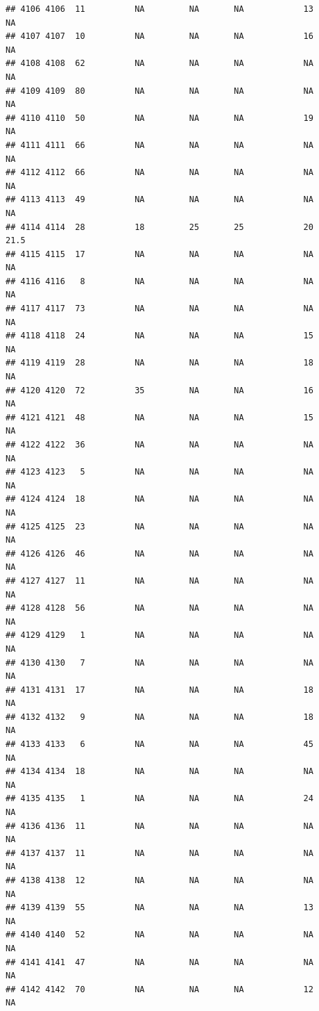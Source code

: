 \documentclass[man]{apa6}
\begin{document}
\begin{verbatim}
## 4106 4106  11          NA         NA       NA            13       NA
## 4107 4107  10          NA         NA       NA            16       NA
## 4108 4108  62          NA         NA       NA            NA       NA
## 4109 4109  80          NA         NA       NA            NA       NA
## 4110 4110  50          NA         NA       NA            19       NA
## 4111 4111  66          NA         NA       NA            NA       NA
## 4112 4112  66          NA         NA       NA            NA       NA
## 4113 4113  49          NA         NA       NA            NA       NA
## 4114 4114  28          18         25       25            20     21.5
## 4115 4115  17          NA         NA       NA            NA       NA
## 4116 4116   8          NA         NA       NA            NA       NA
## 4117 4117  73          NA         NA       NA            NA       NA
## 4118 4118  24          NA         NA       NA            15       NA
## 4119 4119  28          NA         NA       NA            18       NA
## 4120 4120  72          35         NA       NA            16       NA
## 4121 4121  48          NA         NA       NA            15       NA
## 4122 4122  36          NA         NA       NA            NA       NA
## 4123 4123   5          NA         NA       NA            NA       NA
## 4124 4124  18          NA         NA       NA            NA       NA
## 4125 4125  23          NA         NA       NA            NA       NA
## 4126 4126  46          NA         NA       NA            NA       NA
## 4127 4127  11          NA         NA       NA            NA       NA
## 4128 4128  56          NA         NA       NA            NA       NA
## 4129 4129   1          NA         NA       NA            NA       NA
## 4130 4130   7          NA         NA       NA            NA       NA
## 4131 4131  17          NA         NA       NA            18       NA
## 4132 4132   9          NA         NA       NA            18       NA
## 4133 4133   6          NA         NA       NA            45       NA
## 4134 4134  18          NA         NA       NA            NA       NA
## 4135 4135   1          NA         NA       NA            24       NA
## 4136 4136  11          NA         NA       NA            NA       NA
## 4137 4137  11          NA         NA       NA            NA       NA
## 4138 4138  12          NA         NA       NA            NA       NA
## 4139 4139  55          NA         NA       NA            13       NA
## 4140 4140  52          NA         NA       NA            NA       NA
## 4141 4141  47          NA         NA       NA            NA       NA
## 4142 4142  70          NA         NA       NA            12       NA

\end{verbatim}
\end{document}
